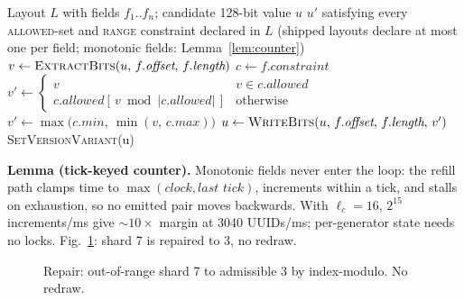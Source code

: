 \documentclass{svproc}
\begin{document}
\begin{algorithm}[!ht]
\caption{Single-pass constraint satisfaction}
\label{alg:repair}
\begin{algorithmic}[1]
\Require Layout $L$ with fields $f_1..f_n$; candidate 128-bit value $u$
\Ensure  $u'$ satisfying every \textsc{allowed}-set and \textsc{range} constraint declared in $L$ (shipped layouts declare at most one per field; monotonic fields: Lemma~\ref{lem:counter})
\Statex
{}
  \State $v \gets \textsc{ExtractBits}(u,\, f.\textit{offset},\, f.\textit{length})$
  \State $c \gets f.\textit{constraint}$
    \State $v' \gets
           \begin{cases}
             v & v \in c.\textit{allowed} \\
             c.\textit{allowed}[\,v \bmod |c.\textit{allowed}|\,] & \text{otherwise}
           \end{cases}$
    \State $v' \gets \max\bigl(c.\textit{min},\ \min(v,\, c.\textit{max})\bigr)$
  \EndIf
  \State $u \gets \textsc{WriteBits}(u,\, f.\textit{offset},\,
          f.\textit{length},\, v')$
\EndFor
\State \Return \textsc{SetVersionVariant}(u)
\end{algorithmic}
\end{algorithm}

\textbf{Lemma (tick-keyed counter).}\label{lem:counter} Monotonic fields never enter the loop: the refill path clamps time to $\max(\textit{clock}, \textit{last tick})$, increments within a tick, and stalls on exhaustion, so no emitted pair moves backwards. With $\ell_c=16$, $2^{15}$ increments/ms give $\sim10\times$ margin at 3040 UUIDs/ms; per-generator state needs no locks. Fig.~\ref{fig:pipeline}: shard 7 is repaired to 3, no redraw.

\begin{figure}[!ht]
\centering
{}
\caption{Repair: out-of-range shard 7 to admissible 3 by index-modulo. No redraw.}
\label{fig:pipeline}
\end{figure}
\end{document}

